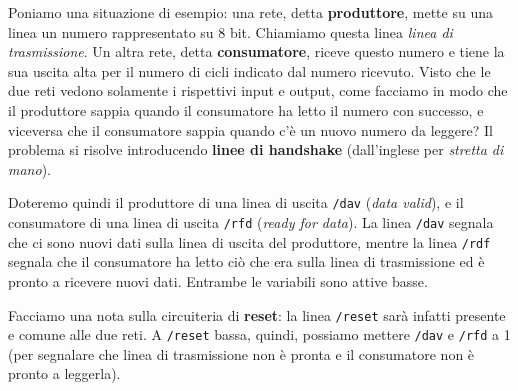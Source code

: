 \documentclass[a4paper,11pt]{article}
\begin{document}
\par\smallskip

Poniamo una situazione di esempio: una rete, detta \textbf{produttore}, mette su una linea un numero rappresentato su 8 bit.
Chiamiamo questa linea \textit{linea di trasmissione}.
Un altra rete, detta \textbf{consumatore}, riceve questo numero e tiene la sua uscita alta per il numero di cicli indicato dal numero ricevuto.
Visto che le due reti vedono solamente i rispettivi input e output, come facciamo in modo che il produttore sappia quando il consumatore ha letto il numero con successo, e viceversa che il consumatore sappia quando c'è un nuovo numero da leggere?
Il problema si risolve introducendo \textbf{linee di handshake} (dall'inglese per \textit{stretta di mano}).

Doteremo quindi il produttore di una linea di uscita \lstinline|/dav| (\textit{data valid}), e il consumatore di una linea di uscita \lstinline|/rfd| (\textit{ready for data}).
La linea \lstinline|/dav| segnala che ci sono nuovi dati sulla linea di uscita del produttore, mentre la linea \lstinline|/rdf| segnala che il consumatore ha letto ciò che era sulla linea di trasmissione ed è pronto a ricevere nuovi dati.
Entrambe le variabili sono attive basse.

Facciamo una nota sulla circuiteria di \textbf{reset}: la linea \lstinline|/reset| sarà infatti presente e comune alle due reti.
A \lstinline|/reset| bassa, quindi, possiamo mettere \lstinline|/dav| e \lstinline|/rfd| a 1 (per segnalare che linea di trasmissione non è pronta e il consumatore non è pronto a leggerla).
\end{document}
